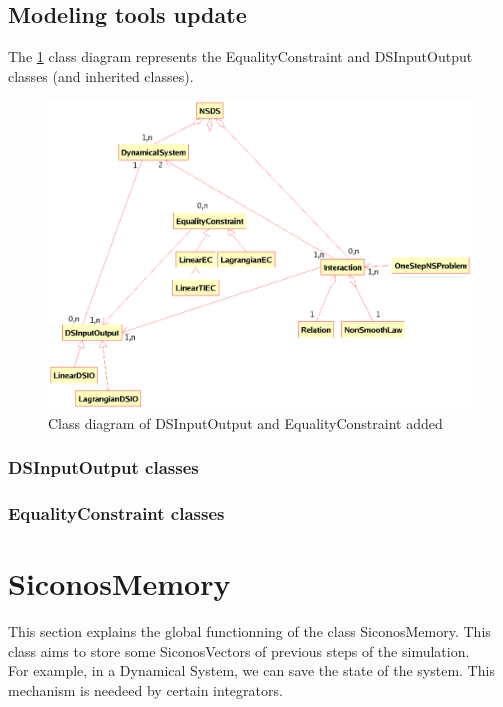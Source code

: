 \subsection{Modeling tools update}
The \ref{fig: Class diagram of DSInputOutput and EqualityConstraint added} class diagram represents the EqualityConstraint and DSInputOutput classes (and inherited classes).
	\begin{figure}
	\begin{center}
	\includegraphics[scale=0.9, clip]{figure/EC.eps}
	\caption{Class diagram of DSInputOutput and EqualityConstraint added}
	\label{fig: Class diagram of DSInputOutput and EqualityConstraint added}
	\end{center}
	\end{figure}
	
\subsubsection{DSInputOutput classes}

\subsubsection{EqualityConstraint classes}



\pagebreak

\section{SiconosMemory}
	
This section explains the global functionning of the class SiconosMemory. This class aims to store some SiconosVectors of previous steps of the simulation.\\
For example, in a Dynamical System, we can save the state of the system. This mechanism is needeed by certain integrators. \\

